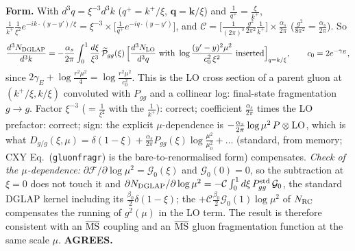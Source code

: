 \noindent\textbf{Form.} With $d^{3}q=\xi^{-3}d^{3}k$ ($q^{+}=k^{+}/\xi$, $\boldsymbol q=\boldsymbol k/\xi$) and $\frac{1}{q^{+}}=\frac{\xi}{k^{+}}$, $\frac{1}{k^{+}}\frac{1}{\xi^{2}}e^{-ik\cdot(y-y')/\xi}=\xi^{-3}\times\big[\frac{1}{q^{+}}e^{-iq\cdot(y-y')}\big]$, and $\mathcal{C}=\big[\frac{1}{(2\pi)^{3}}\frac{g^{2}}{2\pi^{2}}\frac{1}{k^{+}}\big]\times\frac{\alpha_{s}}{2\pi}$ ($\frac{g^{2}}{8\pi^{2}}=\frac{\alpha_{s}}{2\pi}$). So
\begin{equation}
\frac{d^{3}N_{\rm DGLAP}}{d^{3}k}=-\frac{\alpha_{s}}{2\pi}\int_{0}^{1}\frac{d\xi}{\xi^{3}}\,\widetilde{\mathcal P}_{gg}(\xi)\,\Big[\frac{d^{3}N_{\rm LO}}{d^{3}q}\ \text{with}\ \log\frac{(y'-y)^{2}\mu^{2}}{c_{0}^{2}\,\xi^{2}}\ \text{inserted}\Big]_{q=k/\xi},\qquad c_{0}=2e^{-\gamma_{E}},
\end{equation}
since $2\gamma_{E}+\log\frac{r^{2}\mu^{2}}{4}=\log\frac{r^{2}\mu^{2}}{c_{0}^{2}}$. This is the LO cross section of a parent gluon at $(k^{+}/\xi,k/\xi)$ convoluted with $P_{gg}$ and a collinear log: final-state fragmentation $g\to g$. Factor $\xi^{-3}$ ($=\frac{1}{\xi^{2}}$ with the $\frac{1}{k^{+}}$): correct; coefficient $\frac{\alpha_{s}}{2\pi}$ times the LO prefactor: correct; sign: the explicit $\mu$-dependence is $-\frac{\alpha_{s}}{2\pi}\log\mu^{2}\,P\otimes{\rm LO}$, which is what $D_{g/g}(\xi,\mu)=\delta(1-\xi)+\frac{\alpha_{s}}{2\pi}P_{gg}(\xi)\log\frac{\mu^{2}}{\mu_{0}^{2}}+\dots$ (standard, from memory; CXY Eq.~(\texttt{gluonfragr}) is the bare-to-renormalised form) compensates. \emph{Check of the $\mu$-dependence:} $\partial\mathcal{F}/\partial\log\mu^{2}=\mathcal{G}_{0}(\xi)$ and $\mathcal{G}_{0}(0)=0$, so the subtraction at $\xi=0$ does not touch it and $\partial N_{\rm DGLAP}/\partial\log\mu^{2}=-\mathcal{C}\int_{0}^{1}d\xi\,P^{\rm std}_{gg}\,\mathcal{G}_{0}$, the standard DGLAP kernel including its $\frac{\beta_{0}}{2}\delta(1-\xi)$; the $+\mathcal{C}\frac{\beta_{0}}{2}\mathcal{G}_{0}(1)\log\mu^{2}$ of $N_{\rm RC}$ compensates the running of $g^{2}(\mu)$ in the LO term. The result is therefore consistent with an $\overline{\rm MS}$ coupling and an $\overline{\rm MS}$ gluon fragmentation function at the same scale $\mu$. \textbf{AGREES.}

